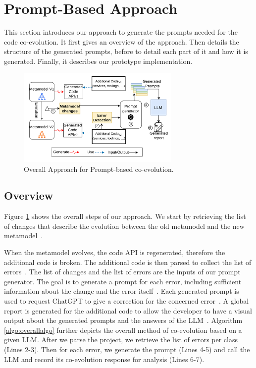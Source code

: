 \section{Prompt-Based Approach}
\label{ch3_appraoch}
This section introduces our approach to generate the prompts needed for the code co-evolution. 
It first gives an overview of the approach. Then details the structure of the generated prompts, before to detail each part of it and how it is generated. Finally, it describes our prototype implementation.  

\begin{figure}
	\centering
	\hspace*{-0.8cm}
	\includegraphics[width=0.7\textwidth]{./pics/chapter3pics/approach.png}
	\caption{Overall Approach for Prompt-based co-evolution.}
	\label{fig: approach}
\end{figure}



\subsection{Overview}

Figure \ref{fig: approach} shows the overall steps of our approach. We start by retrieving the list of changes that describe the evolution between the old metamodel and the new metamodel~. 

When the metamodel evolves, the code API is regenerated, therefore the additional code is broken. The additional code is then parsed to collect the list of errors~. The list of changes and the list of errors are the inputs of our prompt generator. The goal is to generate a prompt for each error, including sufficient information about the change and the error itself~.
Each generated prompt is used to request ChatGPT to give a correction for the concerned error~. A global report is generated for the additional code to allow the developer to have a visual output about the generated prompts and the answers of the LLM~. Algorithm \ref{algo:overallalgo} further depicts the overall method of co-evolution based on a given LLM. After we parse the project, we retrieve the list of errors per class (Lines 2-3). Then for each error, we generate the prompt (Lines 4-5) and call the LLM and record its co-evolution response for analysis (Lines 6-7).


